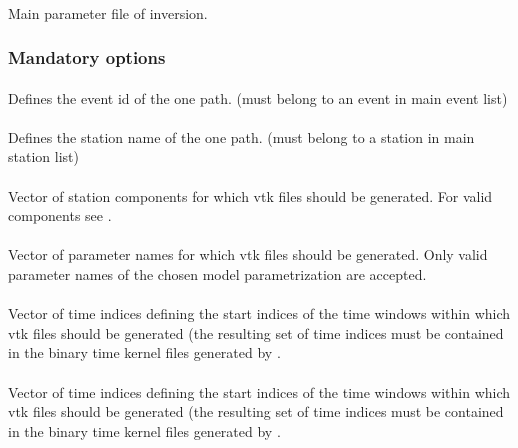 \paragraph{}
Main parameter file of inversion.
\subsubsection{Mandatory options}
\paragraph{ }
Defines the event id of the one path. (must belong to an event in main event list)
\paragraph{ }
Defines the station name of the one path. (must belong to a station in main station list)
\paragraph{}
Vector of station components for which vtk files should be generated. For valid components see .
\paragraph{}
Vector of parameter names for which vtk files should be generated. Only valid parameter names of the chosen model parametrization are accepted. 
\paragraph{}
Vector of  time indices defining the start indices of the  time windows within which vtk files 
should be generated (the resulting set of time indices must be contained in the binary time kernel files generated by 
.
\paragraph{}
Vector of  time indices defining the start indices of the  time windows within which vtk files 
should be generated (the resulting set of time indices must be contained in the binary time kernel files generated by 
.
